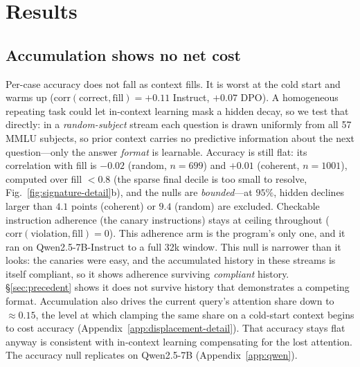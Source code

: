 \documentclass{article}
\begin{document}
\section{Results}

\subsection{Accumulation shows no net cost}
\label{sec:accumulation}

Per-case accuracy does not fall as context fills. It is worst at the cold start and warms up
($\mathrm{corr}(\text{correct},\text{fill})=+0.11$ Instruct, $+0.07$ DPO). A homogeneous
repeating task could let in-context learning mask a hidden decay, so we test that directly:
in a \emph{random-subject} stream each question is drawn uniformly from all 57 MMLU subjects, so
prior context carries no predictive information about the next question---only the answer
\emph{format} is learnable. Accuracy is still flat: its correlation with fill is $-0.02$
(random, $n{=}699$) and $+0.01$ (coherent, $n{=}1001$), computed over fill $<0.8$ (the sparse
final decile is too small to resolve, Fig.~\ref{fig:signature-detail}b), and the nulls are
\emph{bounded}---at
$95\%$, hidden declines larger than $4.1$ points (coherent) or $9.4$ (random) are excluded. Checkable instruction adherence (the canary
instructions) stays at ceiling throughout ($\mathrm{corr}(\text{violation},\text{fill})=0$).
This adherence arm is the program's only one, and it ran on Qwen2.5-7B-Instruct to a full
32k window.
This null is narrower than it looks: the canaries were easy, and the accumulated history in
these streams is itself compliant, so it shows adherence surviving \emph{compliant} history.
\S\ref{sec:precedent} shows it does not survive history that demonstrates a competing format.
Accumulation also drives the current query's attention share down to ${\approx}0.15$, the level
at which clamping the same share on a cold-start context begins to cost accuracy
(Appendix~\ref{app:displacement-detail}). That accuracy stays flat anyway is consistent with
in-context learning compensating for the lost attention. The accuracy null replicates on
Qwen2.5-7B (Appendix~\ref{app:qwen}).
\end{document}
